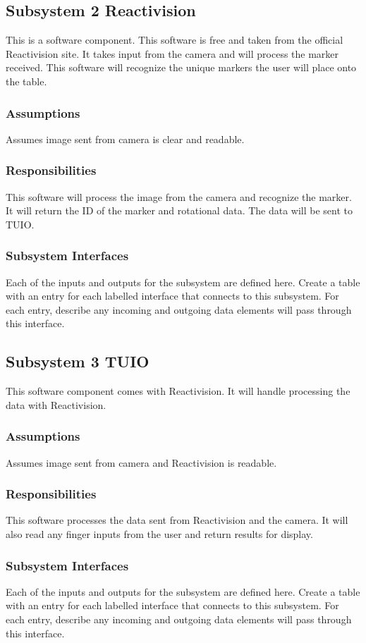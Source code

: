 \subsection{Subsystem 2 Reactivision}
This is a software component. This software is free and taken from the official Reactivision site. It takes input from the camera and will process the marker received. This software will recognize the unique markers the user will place onto the table. 

\subsubsection{Assumptions}
Assumes image sent from camera is clear and readable.  

\subsubsection{Responsibilities}
This software will process the image from the camera and recognize the marker. It will return the ID of the marker and rotational data. The data will be sent to TUIO.

\subsubsection{Subsystem Interfaces}
Each of the inputs and outputs for the subsystem are defined here. Create a table with an entry for each labelled interface that connects to this subsystem. For each entry, describe any incoming and outgoing data elements will pass through this interface.


\subsection{Subsystem 3 TUIO}
This software component comes with Reactivision. It will handle processing the data with Reactivision.

\subsubsection{Assumptions}
Assumes image sent from camera and Reactivision is readable.  

\subsubsection{Responsibilities}
This software processes the data sent from Reactivision and the camera. It will also read any finger inputs from the user and return results for display.

\subsubsection{Subsystem Interfaces}
Each of the inputs and outputs for the subsystem are defined here. Create a table with an entry for each labelled interface that connects to this subsystem. For each entry, describe any incoming and outgoing data elements will pass through this interface.

